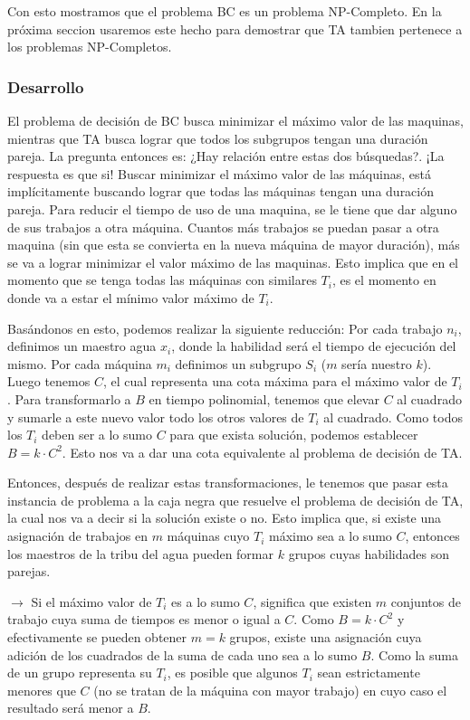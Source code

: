 \documentclass{article}
\begin{document}
Con esto mostramos que el problema BC es un problema NP-Completo. En la próxima seccion usaremos este hecho para demostrar que TA tambien pertenece a los problemas NP-Completos.


\subsubsection{Desarrollo}
El problema de decisión de BC busca minimizar el máximo valor de las maquinas, mientras que TA busca lograr que todos los subgrupos tengan una duración pareja. La pregunta entonces es: ¿Hay relación entre estas dos búsquedas?. ¡La respuesta es que si! Buscar minimizar el máximo valor de las máquinas, está implícitamente buscando lograr que todas las máquinas tengan una duración pareja.
Para reducir el tiempo de uso de una maquina, se le tiene que dar alguno de sus trabajos a otra máquina. Cuantos más trabajos se puedan pasar a otra maquina (sin que esta se convierta en la nueva máquina de mayor duración), más se va a lograr minimizar el valor máximo de las maquinas.
Esto implica que en el momento que se tenga todas las máquinas con similares $T_i$, es el momento en donde va a estar el mínimo valor máximo de $T_i$. 

Basándonos en esto, podemos realizar la siguiente reducción:
Por cada trabajo $n_i$, definimos un maestro agua $x_i$, donde la habilidad será el tiempo de ejecución del mismo. Por cada máquina $m_i$ definimos un subgrupo $S_i$ ($m$ sería nuestro $k$).
Luego tenemos $C$, el cual representa una cota máxima para el máximo valor de $T_i$. Para transformarlo a $B$ en tiempo polinomial, tenemos que elevar $C$ al cuadrado y sumarle a este nuevo valor todo los otros valores de $T_i$ al cuadrado. Como todos los $T_i$ deben ser a lo sumo $C$ para que exista solución, podemos establecer $B = k \cdot C^2$. Esto nos va a dar una cota equivalente al problema de decisión de TA.

Entonces, después de realizar estas transformaciones, le tenemos que pasar esta instancia de problema a la caja negra que resuelve el problema de decisión de TA, la cual nos va a decir si la solución existe o no. Esto implica que, si existe una asignación de trabajos en $m$ máquinas cuyo $T_i$ máximo sea a lo sumo $C$, entonces los maestros de la tribu del agua pueden formar $k$ grupos cuyas habilidades son parejas.

$\rightarrow$ Si el máximo valor de $T_i$ es a lo sumo $C$, significa que existen $m$ conjuntos de trabajo cuya suma de tiempos es menor o igual a $C$. Como $B = k \cdot C^2$ y efectivamente se pueden obtener $m = k$ grupos, existe una asignación cuya adición de los cuadrados de la suma de cada uno sea a lo sumo $B$. Como la suma de un grupo representa su $T_i$, es posible que algunos $T_i$ sean estrictamente menores que $C$ (no se tratan de la máquina con mayor trabajo) en cuyo caso el resultado será menor a $B$. 
\end{document}
